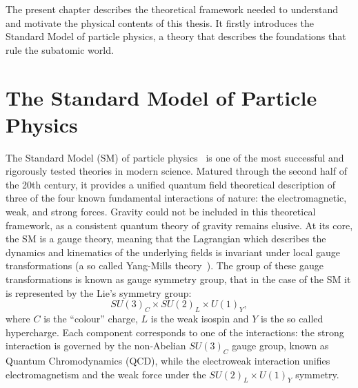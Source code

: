 The present chapter describes the theoretical framework needed to understand and motivate the physical contents of this thesis. 
It firstly introduces the Standard Model of particle physics, a theory that describes the foundations that rule the subatomic world. 

\section{The Standard Model of Particle Physics}
\label{sec:SM_intro}
The Standard Model (SM) of particle physics~\cite{Glashow,Weinberg,Salam} is one of the most successful and rigorously tested theories in modern science. Matured through the second half of the 20th century, it provides a unified quantum field theoretical description of three of the four known fundamental interactions of nature: the electromagnetic, weak, and strong forces. Gravity could not be included in this theoretical framework, as a consistent quantum theory of gravity remains elusive. 
At its core, the SM is a gauge theory, meaning that the Lagrangian which describes the dynamics and kinematics of the underlying fields is invariant under local gauge transformations (a so called Yang-Mills theory~\cite{YMills}). The group of these gauge transformations is known as gauge symmetry group, that in the case of the SM it is represented by the Lie's symmetry group:
\begin{equation}
    SU(3)_C \times SU(2)_L \times U(1)_Y,
\end{equation}
where $C$ is the ``colour'' charge, $L$ is the weak isospin and $Y$ is the so called hypercharge. Each component corresponds to one of the interactions: the strong interaction is governed by the non-Abelian $SU(3)_C$ gauge group, known as Quantum Chromodynamics (QCD), while the electroweak interaction unifies electromagnetism and the weak force under the $SU(2)_L \times U(1)_Y$ symmetry.

